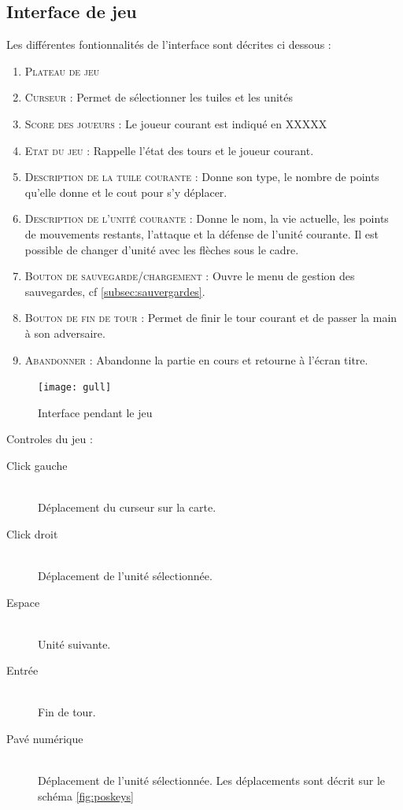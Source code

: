 	\subsection{Interface de jeu}
		\label{sec:interfaceIG}
		Les différentes fontionnalités de l'interface sont décrites ci dessous :
		\begin{enumerate}
			\item \textsc{Plateau de jeu} 
			\item \textsc{Curseur} : Permet de sélectionner les tuiles et les unités
			\item \textsc{Score des joueurs} : Le joueur courant est indiqué en XXXXX
			\item \textsc{Etat du jeu} : Rappelle l'état des tours et le joueur courant.
			\item \textsc{Description de la tuile courante} : Donne son type, le nombre de points qu'elle donne et le cout pour s'y déplacer.
			\item \textsc{Description de l'unité courante} : Donne le nom, la vie actuelle, les points de mouvements restants, l'attaque et la défense de l'unité courante.
						Il est possible de changer d'unité avec les flèches sous le cadre.
			\item \textsc{Bouton de sauvegarde/chargement} : Ouvre le menu de gestion des sauvegardes, cf \ref{subsec:sauvergardes}.
			\item \textsc{Bouton de fin de tour} : Permet de finir le tour courant et de passer la main à son adversaire.
			\item \textsc{Abandonner} : Abandonne la partie en cours et retourne à l'écran titre.
		\end{enumerate}
		
		\begin{figure}[h!]
			\caption{Interface pendant le jeu}
			\label{fig:interfaceIG}
			\centering
			\texttt{[image: gull]}
		\end{figure}
		
		Controles du jeu : 
		\begin{description}
			\item[Click gauche] \hfill \\
				Déplacement du curseur sur la carte.
			\item[Click droit] \hfill \\
				Déplacement de l'unité sélectionnée.
			\item[Espace] \hfill \\
				Unité suivante.
			\item[Entrée] \hfill \\
				Fin de tour.
			\item[Pavé numérique] \hfill \\
				Déplacement de l'unité sélectionnée. Les déplacements sont décrit sur le schéma \ref{fig:poskeys}
		\end{description}
		
